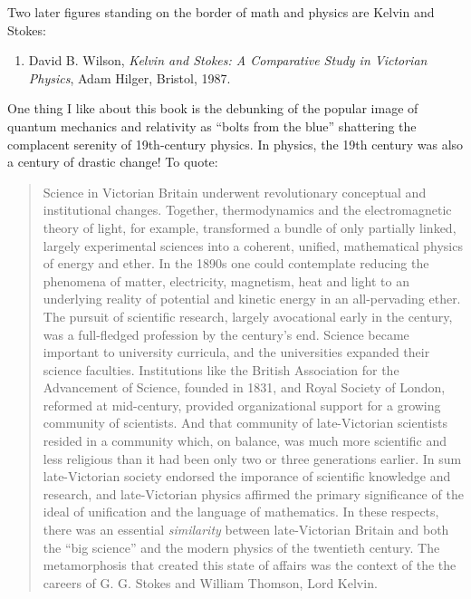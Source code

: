 \documentclass{article}
\def\tightlist{}
\begin{document}
Two later figures standing on the border of math and physics are Kelvin
and Stokes:

\begin{enumerate}
\def\labelenumi{\arabic{enumi})}
\setcounter{enumi}{1}
\tightlist
\item
  David B. Wilson, \emph{Kelvin and Stokes: A Comparative Study in
  Victorian Physics}, Adam Hilger, Bristol, 1987.
\end{enumerate}

One thing I like about this book is the debunking of the popular image
of quantum mechanics and relativity as ``bolts from the blue''
shattering the complacent serenity of 19th-century physics. In physics,
the 19th century was also a century of drastic change! To quote:

\begin{quote}
Science in Victorian Britain underwent revolutionary conceptual and
institutional changes. Together, thermodynamics and the electromagnetic
theory of light, for example, transformed a bundle of only partially
linked, largely experimental sciences into a coherent, unified,
mathematical physics of energy and ether. In the 1890s one could
contemplate reducing the phenomena of matter, electricity, magnetism,
heat and light to an underlying reality of potential and kinetic energy
in an all-pervading ether. The pursuit of scientific research, largely
avocational early in the century, was a full-fledged profession by the
century's end. Science became important to university curricula, and the
universities expanded their science faculties. Institutions like the
British Association for the Advancement of Science, founded in 1831, and
Royal Society of London, reformed at mid-century, provided
organizational support for a growing community of scientists. And that
community of late-Victorian scientists resided in a community which, on
balance, was much more scientific and less religious than it had been
only two or three generations earlier. In sum late-Victorian society
endorsed the imporance of scientific knowledge and research, and
late-Victorian physics affirmed the primary significance of the ideal of
unification and the language of mathematics. In these respects, there
was an essential \emph{similarity} between late-Victorian Britain and
both the ``big science'' and the modern physics of the twentieth
century. The metamorphosis that created this state of affairs was the
context of the the careers of G. G. Stokes and William Thomson, Lord
Kelvin.
\end{quote}
\end{document}
